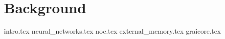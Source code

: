 \chapter{Background}
\label{ch:2}
{intro.tex}
{neural_networks.tex}
{noc.tex}
{external_memory.tex}
{graicore.tex}



